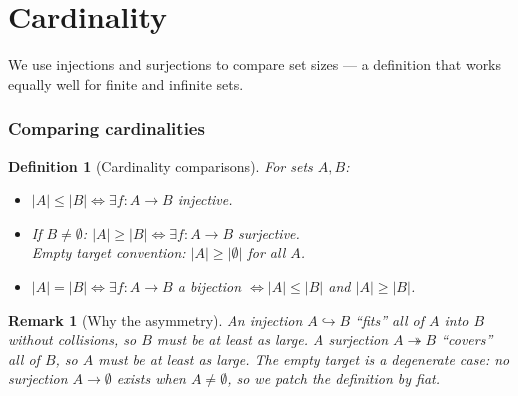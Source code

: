 \documentclass[11pt]{article}
\theoremstyle{defstyle}
\newtheorem{definition}{Definition}[section]
\theoremstyle{thmstyle}
\theoremstyle{notstyle}
\newtheorem*{remark}{Remark}
\theoremstyle{cautionstyle}
\newcommand{\card}[1]{\lvert #1 \rvert}
\begin{document}
\newpage

\part{Cardinality}

We use injections and surjections to compare set sizes --- a definition
that works equally well for finite and infinite sets.

\section{Comparing cardinalities}

\begin{defbox}
\begin{definition}[Cardinality comparisons]
For sets $A, B$:
\begin{itemize}[leftmargin=2em, itemsep=2pt]
  \item $\card{A} \leq \card{B} \iff \exists f \colon A \to B$ injective.
  \item If $B \neq \emptyset$:
        $\card{A} \geq \card{B} \iff \exists f \colon A \to B$ surjective.\\
        \emph{Empty target convention:} $\card{A} \geq \card{\emptyset}$
        for all $A$.
  \item $\card{A} = \card{B} \iff \exists f \colon A \to B$ a bijection
        $\iff \card{A} \leq \card{B}$ and $\card{A} \geq \card{B}$.
\end{itemize}
\end{definition}
\end{defbox}

\begin{notebox}
\begin{remark}[Why the asymmetry]
An injection $A \hookrightarrow B$ ``fits'' all of $A$ into $B$ without
collisions, so $B$ must be at least as large.  A surjection
$A \twoheadrightarrow B$ ``covers'' all of $B$, so $A$ must be at least
as large.  The empty target is a degenerate case: no surjection
$A \to \emptyset$ exists when $A \neq \emptyset$, so we patch the
definition by fiat.
\end{remark}
\end{notebox}

\end{document}

